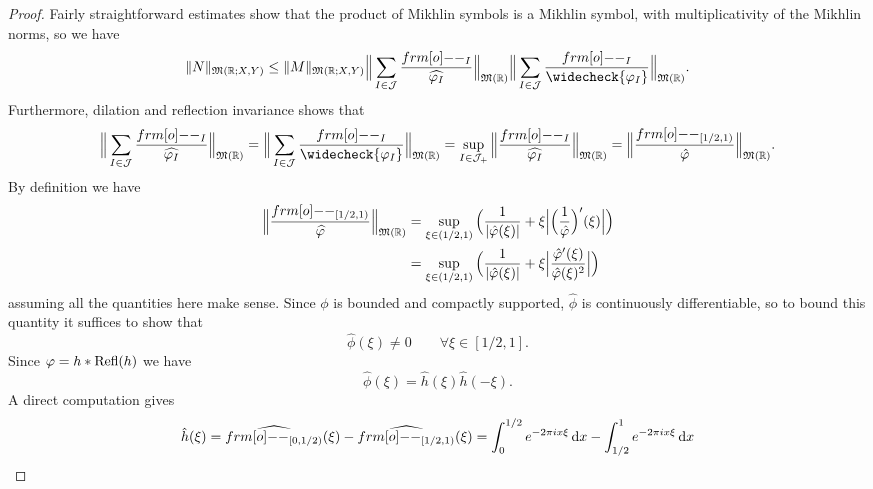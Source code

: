 \begin{proof}
  Fairly straightforward estimates show that the product of Mikhlin symbols is a Mikhlin symbol, with multiplicativity of the Mikhlin norms, so we have
  \begin{equation*}
     \|N\|_{\mf{M}(\R;X,Y)} \leq \|M\|_{\mf{M}(\R;X,Y)} \Big\| \sum_{I \in \mc{J}} \frac{\1_{I} }{\widehat{\phi_{I}}} \Big\|_{\mf{M}(\R)} \Big\| \sum_{I \in \mc{J}} \frac{\1_{I} }{\widecheck{\phi_{I}}} \Big\|_{\mf{M}(\R)}.
   \end{equation*}
   Furthermore, dilation and reflection invariance shows that
   \begin{equation*}
     \Big\| \sum_{I \in \mc{J}} \frac{\1_{I} }{\widehat{\phi_{I}}} \Big\|_{\mf{M}(\R)}
     = \Big\| \sum_{I \in \mc{J}} \frac{\1_{I} }{\widecheck{\phi_{I}}} \Big\|_{\mf{M}(\R)}
     = \sup_{I \in \mc{J_{+}}} \Big\| \frac{\1_{I}}{\widehat{\phi_{I}}} \Big\|_{\mf{M}(\R)}
     = \Big\| \frac{\1_{[1/2,1)}}{\hat{\phi}} \Big\|_{\mf{M}(\R)}.
   \end{equation*}
   By definition we have
   \begin{equation*}
     \begin{aligned}
       \Big\| \frac{\1_{[1/2,1)}}{\widehat{\phi}} \Big\|_{\mf{M}(\R)}
       &= \sup_{\xi \in (1/2, 1)} \Big( \frac{1}{|\hat{\phi}(\xi)|}  + \xi\Big|\Big(\frac{1}{\hat{\phi}}\Big)'(\xi) \Big| \Big) \\
       &= \sup_{\xi \in (1/2, 1)} \Big( \frac{1}{|\hat{\phi}(\xi)|}  + \xi\Big|\frac{\hat{\phi}'(\xi)}{\hat{\phi}(\xi)^2}\Big| \Big)
   \end{aligned}
   \end{equation*}
   assuming all the quantities here make sense.
   Since $\phi$ is bounded and compactly supported, $\hat{\phi}$ is continuously differentiable, so to bound this quantity it suffices to show that
   \begin{equation}\label{eq:phi-0}
     \hat{\phi}(\xi) \neq 0 \qquad \forall \xi \in [1/2, 1].
   \end{equation}
   Since $\varphi = h \ast \operatorname{Refl}(h)$ we have
   \begin{equation*}
     \hat{\phi}(\xi) = \hat{h}(\xi) \hat{h}(-\xi).
   \end{equation*}
   A direct computation gives
   \begin{equation*}
     \begin{aligned}
     \hat{h}(\xi) = \widehat{\1_{[0,1/2)}}(\xi) - \widehat{\1_{[1/2,1)}}(\xi)
     &= \int_{0}^{1/2} e^{-2\pi i x \xi} \, \dd x - \int_{1/2}^{1} e^{-2\pi i x \xi} \, \dd x \\

\end{aligned}
\end{equation*}
\end{proof}
